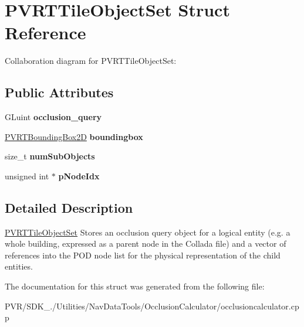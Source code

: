 \hypertarget{struct_p_v_r_t_tile_object_set}{\section{P\+V\+R\+T\+Tile\+Object\+Set Struct Reference}
\label{struct_p_v_r_t_tile_object_set}
}


Collaboration diagram for P\+V\+R\+T\+Tile\+Object\+Set\+:
\subsection*{Public Attributes}
\begin{DoxyCompactItemize}
\item 
\hypertarget{struct_p_v_r_t_tile_object_set_a2da7d785cd8abe43846ad064ea56c395}{G\+Luint {\bfseries occlusion\+\_\+query}}\label{struct_p_v_r_t_tile_object_set_a2da7d785cd8abe43846ad064ea56c395}

\item 
\hypertarget{struct_p_v_r_t_tile_object_set_ab2f13518bcbc8be98f0c0246aa737984}{\hyperlink{struct_p_v_r_t_bounding_box2_d}{P\+V\+R\+T\+Bounding\+Box2\+D} {\bfseries boundingbox}}\label{struct_p_v_r_t_tile_object_set_ab2f13518bcbc8be98f0c0246aa737984}

\item 
\hypertarget{struct_p_v_r_t_tile_object_set_a274f880bd1961fe3b25bf4c6146e5da0}{size\+\_\+t {\bfseries num\+Sub\+Objects}}\label{struct_p_v_r_t_tile_object_set_a274f880bd1961fe3b25bf4c6146e5da0}

\item 
\hypertarget{struct_p_v_r_t_tile_object_set_aa516c2f2e4d7ec284f1dd1cc4a1ba5af}{unsigned int $\ast$ {\bfseries p\+Node\+Idx}}\label{struct_p_v_r_t_tile_object_set_aa516c2f2e4d7ec284f1dd1cc4a1ba5af}

\end{DoxyCompactItemize}


\subsection{Detailed Description}


  \hyperlink{struct_p_v_r_t_tile_object_set}{P\+V\+R\+T\+Tile\+Object\+Set}  Stores an occlusion query object for a logical entity (e.\+g. a whole building, expressed as a parent node in the Collada file) and a vector of references into the P\+O\+D node list for the physical representation of the child entities. 

The documentation for this struct was generated from the following file\+:\begin{DoxyCompactItemize}
\item 
P\+V\+R/\+S\+D\+K\+\_./\+Utilities/\+Nav\+Data\+Tools/\+Occlusion\+Calculator/occlusioncalculator.\+cpp\end{DoxyCompactItemize}

